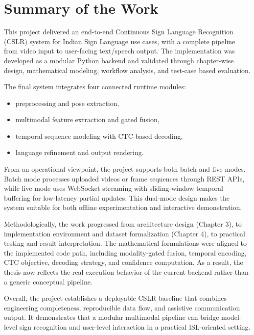 \section{Summary of the Work}
This project delivered an end-to-end Continuous Sign Language Recognition (CSLR) system for Indian Sign Language use cases, with a complete pipeline from video input to user-facing text/speech output. The implementation was developed as a modular Python backend and validated through chapter-wise design, mathematical modeling, workflow analysis, and test-case based evaluation.

The final system integrates four connected runtime modules:
\begin{itemize}[leftmargin=1.5em]
\item preprocessing and pose extraction,
\item multimodal feature extraction and gated fusion,
\item temporal sequence modeling with CTC-based decoding,
\item language refinement and output rendering.
\end{itemize}

From an operational viewpoint, the project supports both batch and live modes. Batch mode processes uploaded videos or frame sequences through REST APIs, while live mode uses WebSocket streaming with sliding-window temporal buffering for low-latency partial updates. This dual-mode design makes the system suitable for both offline experimentation and interactive demonstration.

Methodologically, the work progressed from architecture design (Chapter 3), to implementation environment and dataset formalization (Chapter 4), to practical testing and result interpretation. The mathematical formulations were aligned to the implemented code path, including modality-gated fusion, temporal encoding, CTC objective, decoding strategy, and confidence computation. As a result, the thesis now reflects the real execution behavior of the current backend rather than a generic conceptual pipeline.

Overall, the project establishes a deployable CSLR baseline that combines engineering completeness, reproducible data flow, and assistive communication output. It demonstrates that a modular multimodal pipeline can bridge model-level sign recognition and user-level interaction in a practical ISL-oriented setting.
